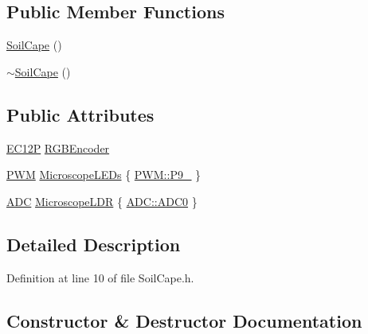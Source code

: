 \subsection*{Public Member Functions}
\begin{DoxyCompactItemize}
\item 
\hyperlink{class_hardware_1_1_soil_cape_acbe71c2b3132c35e3aa9fb619e193a10}{Soil\+Cape} ()
\item 
\hyperlink{class_hardware_1_1_soil_cape_acde8b92055d91a85b016623c7ccd5f5c}{$\sim$\+Soil\+Cape} ()
\end{DoxyCompactItemize}
\subsection*{Public Attributes}
\begin{DoxyCompactItemize}
\item 
\hyperlink{class_hardware_1_1_e_c12_p}{E\+C12\+P} \hyperlink{class_hardware_1_1_soil_cape_a0e68dc6f30fdcbff0462d2996e47a338}{R\+G\+B\+Encoder}
\item 
\hyperlink{class_hardware_1_1_p_w_m}{P\+W\+M} \hyperlink{class_hardware_1_1_soil_cape_a80d499485dddb861cddaffa439b655dd}{Microscope\+L\+E\+Ds} \{ \hyperlink{class_hardware_1_1_p_w_m_a7cc6acf1c28f0eaef16246635dc0353aa68cc50c029ae66d2fa7014839e40f771}{P\+W\+M\+::\+P9\+\_} \}
\item 
\hyperlink{class_hardware_1_1_a_d_c}{A\+D\+C} \hyperlink{class_hardware_1_1_soil_cape_a7a6d0bcfcba2d65f4c19ab41cbaace46}{Microscope\+L\+D\+R} \{ \hyperlink{class_hardware_1_1_a_d_c_adb1507998c096cbdf7031527f6a690cfaaad3628f17c4d36b8d16123e7017ad63}{A\+D\+C\+::\+A\+D\+C0} \}
\end{DoxyCompactItemize}


\subsection{Detailed Description}


Definition at line 10 of file Soil\+Cape.\+h.



\subsection{Constructor \& Destructor Documentation}
\hypertarget{class_hardware_1_1_soil_cape_acbe71c2b3132c35e3aa9fb619e193a10}{}
